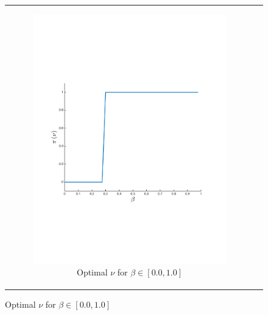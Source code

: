 {\begin{figure}[ht]
\begin{tabular}{cc}
            \begin{subfigure}{0.24\textwidth}\centering\includegraphics[width=\textwidth]{images/sir_opt_new}\caption{Optimal {\footnotesize $ \nu $} for {\footnotesize $ \beta \in \left[ 0.0, 1.0 \right] $}}\label{fig:sir_opt}\end{subfigure}
            \\

\end{tabular}
\end{figure}}
